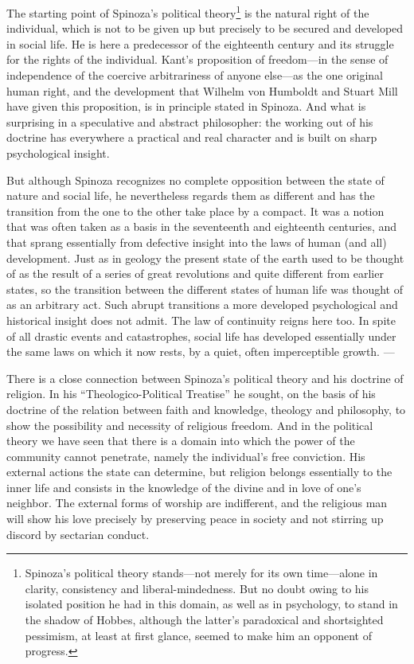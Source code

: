 \documentclass[12pt]{book}
\newcommand{\opage}[1]{\marginnote{\footnotesize\textit{[#1]}}}
\begin{document}
The starting point of Spinoza's political theory\footnote{Spinoza's political theory
stands---not merely for its own time---alone in clarity, consistency and
liberal-mindedness. But no doubt owing to his isolated position he had in this domain, as
well as in psychology, to stand in the shadow of Hobbes, although the latter's paradoxical
and shortsighted pessimism, at least at first glance, seemed to make him an opponent of
progress.} is the natural right of the individual, which is not to be given up but
precisely to be secured and developed in social life. He is here a predecessor of the
eighteenth century and its struggle for the rights of the individual. Kant's proposition
of freedom---in the sense of independence of the coercive arbitrariness of anyone
else---as the one original human right, and the development that Wilhelm von Humboldt and
Stuart Mill have given this proposition, is in principle stated in Spinoza. And what is
surprising in a speculative and abstract philosopher: the working out of his doctrine has
everywhere a practical and real character and is built on sharp psychological insight.

But although Spinoza recognizes no complete \opage{155}opposition between the state of
nature and social life, he nevertheless regards them as different and has the transition
from the one to the other take place by a compact. It was a notion that was often taken
as a basis in the seventeenth and eighteenth centuries, and that sprang essentially from
defective insight into the laws of human (and all) development. Just as in geology the
present state of the earth used to be thought of as the result of a series of great
revolutions and quite different from earlier states, so the transition between the
different states of human life was thought of as an arbitrary act. Such abrupt
transitions a more developed psychological and historical insight does not admit. The
law of continuity reigns here too. In spite of all drastic events and catastrophes, social
life has developed essentially under the same laws on which it now rests, by a quiet,
often imperceptible growth. ---

There is a close connection between Spinoza's political theory and his doctrine of
religion. In his ``Theologico-Political Treatise'' he sought, on the basis of his doctrine
of the relation between faith and knowledge, theology and philosophy, to show the
possibility and necessity of religious freedom. And in the political theory we have seen
that there is a domain into which the power of the community cannot penetrate, namely
the individual's free conviction. His external actions the state can determine, but
religion belongs essentially to the inner life and consists in the knowledge of the
divine and in love of one's neighbor. The external forms of worship are indifferent, and
the religious man will \opage{156}show his love precisely by preserving peace in society
and not stirring up discord by sectarian conduct.
\end{document}
